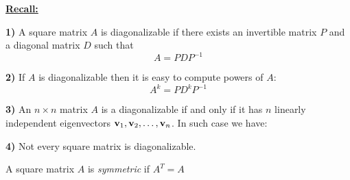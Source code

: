 {%


\underline{\bf Recall:}

\vskip 5mm

{\bf 1)} A square matrix $A$ is diagonalizable if there exists an invertible matrix $P$ and a diagonal matrix
$D$ such that 
$$A = PDP^{-1}$$

\vskip 15mm

{\bf 2)}  If $A$ is diagonalizable then it is easy to compute powers of $A$:
$$A^{k} = PD^{k}P^{-1}$$

\vskip 15mm

{\bf 3)} An $n\times n$ matrix   $A$ is a diagonalizable if and only if it has $n$ linearly independent 
eigenvectors ${\bf v}_{1}, {\bf v}_{2}, \dots, {\bf v}_{n}$.  In such case  we have:

\vskip 10mm



\vskip 15mm

{\bf 4)}  Not every square matrix is diagonalizable. 




\newpage

\begin{cbox}[Definition]
A square matrix  $A$  is \emph{symmetric} if $A^{T} = A$ 
\end{cbox}


\vskip 20mm

}
